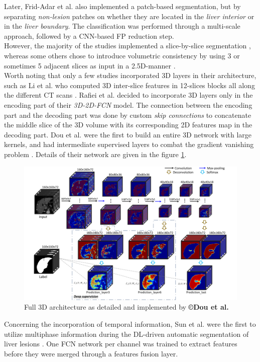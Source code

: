 Later, Frid-Adar et al. \cite{Frid-adar2017} also implemented a patch-based
segmentation, but by separating \emph{non-lesion} patches on whether
they are located in the \emph{liver interior} or in the \emph{liver
	boundary}. The classification was performed through a multi-scale
approach, followed by a CNN-based FP reduction step.\\
However, the majority of the studies implemented a slice-by-slice
segmentation \cite{Chlebus2018, Kaluva2018, Bi2017}, whereas some others chose to introduce volumetric
consistency by using 3 or sometimes 5 adjacent slices as input in a
2.5D-manner \cite{Han2017, Yuan2017, Bellver2017}.\\
Worth noting that only a few studies incorporated 3D layers in
their architecture, such as Li et al. who computed 3D
inter-slice features in 12-slices blocks all along the different CT
scans \cite{Li2018}. Rafiei et al. \cite{Rafiei2018} decided to incorporate 3D layers only in
the encoding part of their \emph{3D-2D-FCN} model. The connection
between the encoding part and the decoding part was done by custom
\emph{skip connections} to concatenate the middle slice of the 3D volume
with its corresponding 2D features map in the decoding part. Dou
et al. were the first to build an entire 3D network with large kernels,
and had intermediate supervised layers to combat the gradient vanishing
problem \cite{Dou2016}. Details of their network are given in the figure \ref{Dou2016_3Darchitecture}.

\begin{figure}[th!]
	\centering
	\includegraphics[width=0.7\linewidth]{images/image30}
	\caption{Full 3D architecture as detailed and implemented by \textbf{©Dou et al. \cite{Dou2016}}}
	\label{Dou2016_3Darchitecture}
\end{figure}

Concerning the incorporation of temporal information, Sun et
al. were the first to utilize multiphase information during the
DL-driven automatic segmentation of liver lesions \cite{Sun2017}. One FCN network per
channel was trained to extract features before they were merged through
a features fusion layer.

